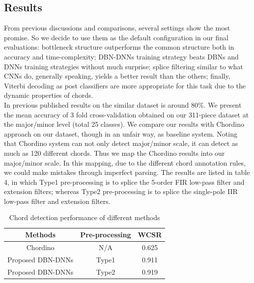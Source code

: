 \documentclass{article}
\begin{document}
\subsection{Results}
From previous discussions and comparisons, several settings show the most promise. So we decide to use them as the default configuration in our final evaluations: bottleneck structure outperforms the common structure both in accuracy and time-complexity; DBN-DNNs training strategy beats DBNs and DNNs training strategies without much surprise; splice filtering similar to what CNNs do, generally speaking, yields a better result than the others; finally, Viterbi decoding as post classifiers are more appropriate for this task due to the dynamic properties of chords.  \\
In previous published results \cite{cho2011feature} on the similar dataset is around 80\%. We present the mean accuracy of 3 fold cross-validation obtained on our 311-piece dataset at the major/minor level (total 25 classes). We compare our results with Chordino approach on our dataset, though in an unfair way, as baseline system. Noting that Chordino system can not only detect major/minor scale, it can detect as much as 120 different chords. Thus we map the Chordino results into our major/minor scale. In this mapping, due to the different chord annotation rules, we could make mistakes through imperfect parsing. The results are listed in table 4, in which Type1 pre-processing is to splice the 5-order FIR low-pass filter and extension filters; whereas Type2 pre-processing is to splice the single-pole IIR low-pass filter and extension filters. 

\begin{table}[h]
\begin{tabular}{@{}ccc@{}}
\toprule
Methods   & Pre-processing & WCSR   \\ \midrule
Chordino & N/A            & 0.625       \\
Proposed DBN-DNNs & Type1          & 0.911 \\
Proposed DBN-DNNs & Type2          & 0.919   \\ \bottomrule
\end{tabular}
\caption{Chord detection performance of different methods}
\end{table}
\end{document}
